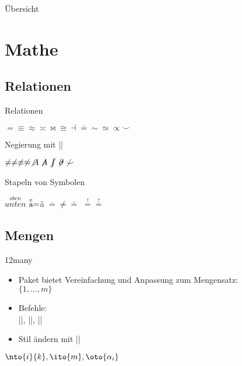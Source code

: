 \documentclass[
	vorläufig=false,
	datum=2018-11-12,
	titel={Mathematiksatz II},
	web=true,
	max,
	aspectratio=1610,
]{../tex/latexkurs-slides}
\begin{document}
\begin{frame}{Übersicht}
	\tableofcontents
\end{frame}



\section{Mathe}
\subsection{Relationen}
\begin{frame}[fragile]{Relationen}
\begin{LTXexample}
\(= \equiv \approx \asymp \bowtie \cong \dashv \doteq \sim \simeq \propto \smile\)
\end{LTXexample}
\pause Negierung mit |\not|

\begin{LTXexample} 
\(\not = \neq \not\equiv
\not \approx \not A \not\kern-.25em A
\not\kern-.2em\int \not\kern-.2em\partial \not \smile\)
\end{LTXexample}
\pause Stapeln von Symbolen

\begin{LTXexample}
\(\stackrel{oben}{unten}\)
\(\stackrel{\text e}{\text a}=\)ä
\(\stackrel . = \neq \doteq\)
\(\stackrel != \stackrel ?=\)
\end{LTXexample}
\end{frame}


\subsection{Mengen}
\begin{frame}[fragile]{12many}
\begin{itemize}
\item Paket  bietet Vereinfachung und Anpassung zum Mengensatz:\\%
\(\{1, \dots, m\}\)
\item Befehle:\\
||, ||, ||
\item Stil ändern mit ||
\end{itemize}
\begin{LTXexample}[width=.6\textwidth]
\( \nto{i}{k},
  \ito{m},
  \oto{\alpha_i} \)
\end{LTXexample}
\end{frame}
\end{document}
